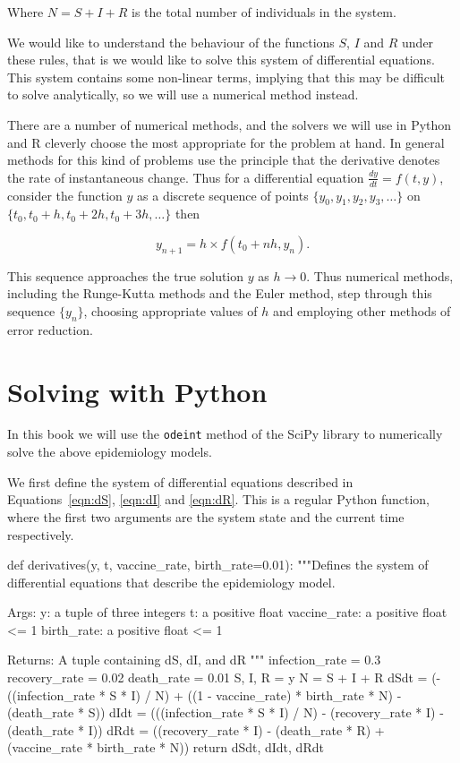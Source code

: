 Where $N = S + I + R$ is the total number of individuals in the system.

We would like to understand the behaviour of the functions $S$, $I$ and $R$
under these rules, that is we would like to solve this system of differential
equations. This system contains some non-linear terms, implying that this may be
difficult to solve analytically, so we will use a numerical method instead.

There are a number of numerical methods, and the solvers we will use in Python
and R cleverly choose the most appropriate for the problem at hand. In general
methods for this kind of problems use the principle that the derivative denotes
the rate of instantaneous change. Thus for a differential equation
$\frac{dy}{dt} = f(t,y)$, consider the function $y$ as a discrete sequence of
points $\{y_0, y_1, y_2, y_3, \dots\}$ on
$\{t_0, t_0 + h, t_0 + 2h, t_0 + 3h, \dots\}$ then

\begin{equation}
y_{n+1} = h \times f(t_0 + nh, y_n).
\end{equation}

This sequence approaches the true solution $y$ as $h \rightarrow 0$.
Thus numerical methods, including the Runge-Kutta methods and the Euler method,
step through this sequence $\{y_n\}$, choosing appropriate values of $h$ and
employing other methods of error reduction.


\section{Solving with Python}\label{sec:solving-with-python}
In this book we will use the \texttt{odeint} method of the SciPy
library to numerically solve the above epidemiology models.

We first define the system of differential equations described in
Equations~\ref{eqn:dS}, \ref{eqn:dI} and \ref{eqn:dR}.
This is a regular Python function, where the first two arguments are the system
state and the current time respectively.

\begin{pyin}
def derivatives(y, t, vaccine_rate, birth_rate=0.01):
    """Defines the system of differential equations that
    describe the epidemiology model.
    
    Args:
        y: a tuple of three integers
        t: a positive float
        vaccine_rate: a positive float <= 1
        birth_rate: a positive float <= 1
    
    Returns:
        A tuple containing dS, dI, and dR
    """
    infection_rate = 0.3
    recovery_rate = 0.02
    death_rate = 0.01
    S, I, R = y
    N = S + I + R
    dSdt = (-((infection_rate * S * I) / N)
            + ((1 - vaccine_rate) * birth_rate * N)
            - (death_rate * S))
    dIdt = (((infection_rate * S * I) / N)
            - (recovery_rate * I)
            - (death_rate * I))
    dRdt = ((recovery_rate * I)
            - (death_rate * R)
            + (vaccine_rate * birth_rate * N))
    return dSdt, dIdt, dRdt
\end{pyin}

